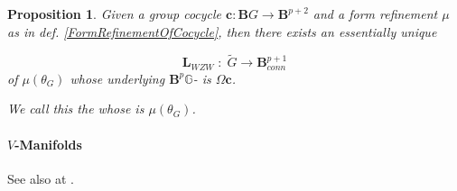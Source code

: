\documentclass[12pt,titlepage]{article}
\theoremstyle{plain}
\newtheorem{prop}{Proposition}
\theoremstyle{definition}
\theoremstyle{remark}
\begin{document}
\begin{prop}
\label{WZWTermFromCocycle}\hypertarget{WZWTermFromCocycle}{}
Given a group cocycle $\mathbf{c} \colon \mathbf{B}G \to \mathbf{B}^{p+2}$ and a form refinement $\mu$ as in def. \ref{FormRefinementOfCocycle}, then there exists an essentially unique 

\begin{displaymath}
\mathbf{L}_{WZW}
  \;\colon\;
  \tilde G \longrightarrow \mathbf{B}^{p+1}_{conn}
\end{displaymath}
of $\mu(\theta_G)$ whose underlying $\mathbf{B}^p\mathbb{G}$- is $\Omega \mathbf{c}$.

We call this the  whose  is $\mu(\theta_G)$.

\end{prop}
\hypertarget{Manifolds}{}\paragraph*{{$V$-Manifolds}}\label{Manifolds}

See also at .
\end{document}
